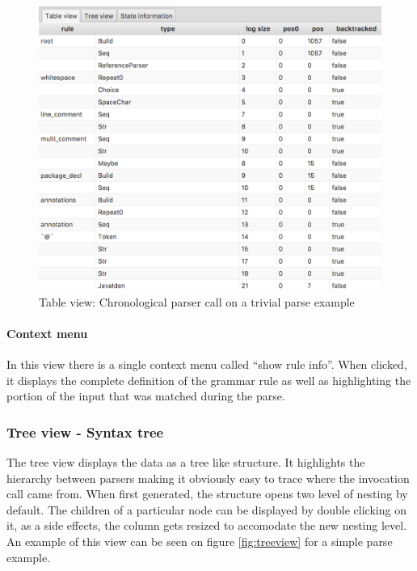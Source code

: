 
	\bigskip

	\begin{figure}[h]
		\centering
		\includegraphics[width=.7\textwidth] {ressources/tableview}
		\caption{Table view: Chronological parser call on a trivial parse example} 
		\label{fig:tableview}
	\end{figure}

	\paragraph{Context menu} In this view there is a single context menu called ``show rule info''. When clicked, it displays the complete definition of the grammar rule as well as highlighting the portion of the input that was matched during the parse.  


	\subsubsection{Tree view - Syntax tree} The tree view displays the data as a tree like structure. It highlights the hierarchy between parsers making it obviously easy to trace where the invocation call came from. When first generated, the structure opens two level of nesting by default. The children of a particular node can be displayed by double clicking on it, as a side effects, the column gets resized to accomodate the new nesting level. An example of this view can be seen on figure \ref{fig:treeview} for a simple parse example.
	
